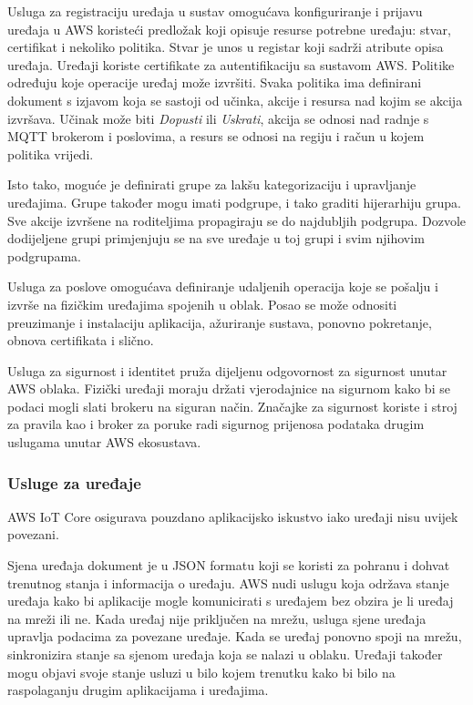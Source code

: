 Usluga za registraciju uređaja u sustav  omogućava konfiguriranje i prijavu uređaja u AWS koristeći predložak koji opisuje resurse potrebne uređaju: stvar, certifikat i nekoliko politika. Stvar  je unos u registar koji sadrži atribute opisa uređaja. Uređaji koriste certifikate za autentifikaciju sa sustavom AWS. Politike određuju koje operacije uređaj može izvršiti. Svaka politika ima definirani dokument s izjavom koja se sastoji od učinka, akcije i resursa nad kojim se akcija izvršava. Učinak može biti \textit{Dopusti} ili \textit{Uskrati}, akcija se odnosi nad radnje s MQTT brokerom i poslovima, a resurs se odnosi na regiju i račun u kojem politika vrijedi. 

Isto tako, moguće je definirati grupe za lakšu kategorizaciju i upravljanje uređajima. Grupe također mogu imati podgrupe, i tako graditi hijerarhiju grupa. Sve akcije izvršene na roditeljima propagiraju se do najdubljih podgrupa. Dozvole dodijeljene grupi primjenjuju se na sve uređaje u toj grupi i svim njihovim podgrupama. 

Usluga za poslove  omogućava definiranje udaljenih operacija koje se pošalju i izvrše na fizičkim uređajima spojenih u oblak. Posao se može odnositi preuzimanje i instalaciju aplikacija, ažuriranje sustava, ponovno pokretanje, obnova certifikata i slično.

Usluga za sigurnost i identitet pruža dijeljenu odgovornost za sigurnost unutar AWS oblaka. Fizički uređaji moraju držati vjerodajnice na sigurnom kako bi se podaci mogli slati brokeru na siguran način. Značajke za sigurnost koriste i stroj za pravila kao i broker za poruke radi sigurnog prijenosa podataka drugim uslugama unutar AWS ekosustava.

\subsubsection{Usluge za uređaje}

AWS IoT Core osigurava pouzdano aplikacijsko iskustvo iako uređaji nisu uvijek povezani. 

Sjena uređaja  dokument je u JSON formatu koji se koristi za pohranu i dohvat trenutnog stanja i informacija o uređaju. AWS nudi uslugu koja održava stanje uređaja  kako bi aplikacije mogle komunicirati s uređajem bez obzira je li uređaj na mreži ili ne. Kada uređaj nije priključen na mrežu, usluga sjene uređaja upravlja podacima za povezane uređaje. Kada se uređaj ponovno spoji na mrežu, sinkronizira stanje sa sjenom uređaja koja se nalazi u oblaku. Uređaji također mogu objavi svoje stanje usluzi u bilo kojem trenutku kako bi bilo na raspolaganju drugim aplikacijama i uređajima. 

